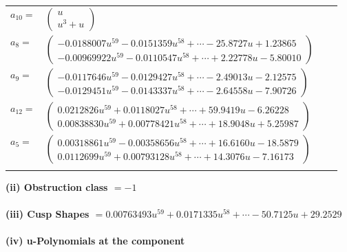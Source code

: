 \documentclass[1p]{elsarticle_modified}
\theoremstyle{definition}
\begin{document}
\begin{tabular}{m{7pt} m{180pt} m{7pt} m{180pt} }
\flushright $a_{10}=$&$\begin{pmatrix}u\\u^3+u\end{pmatrix}$ \\
\flushright $a_{8}=$&$\begin{pmatrix}-0.0188007 u^{59}-0.0151359 u^{58}+\cdots-25.8727 u+1.23865\\-0.00969922 u^{59}-0.0110547 u^{58}+\cdots+2.22778 u-5.80010\end{pmatrix}$ \\
\flushright $a_{9}=$&$\begin{pmatrix}-0.0117646 u^{59}-0.0129427 u^{58}+\cdots-2.49013 u-2.12575\\-0.0129451 u^{59}-0.0143337 u^{58}+\cdots-2.64558 u-7.90726\end{pmatrix}$ \\
\flushright $a_{12}=$&$\begin{pmatrix}0.0212826 u^{59}+0.0118027 u^{58}+\cdots+59.9419 u-6.26228\\0.00838830 u^{59}+0.00778421 u^{58}+\cdots+18.9048 u+5.25987\end{pmatrix}$ \\
\flushright $a_{5}=$&$\begin{pmatrix}0.00318861 u^{59}-0.00358656 u^{58}+\cdots+16.6160 u-18.5879\\0.0112699 u^{59}+0.00793128 u^{58}+\cdots+14.3076 u-7.16173\end{pmatrix}$\\&\end{tabular}
\flushleft \textbf{(ii) Obstruction class $= -1$}\\~\\
\flushleft \textbf{(iii) Cusp Shapes $= 0.00763493 u^{59}+0.0171335 u^{58}+\cdots-50.7125 u+29.2529$}\\~\\
\newpage\renewcommand{\arraystretch}{1}
\flushleft \textbf{(iv) u-Polynomials at the component}\newline \\
\end{document}
